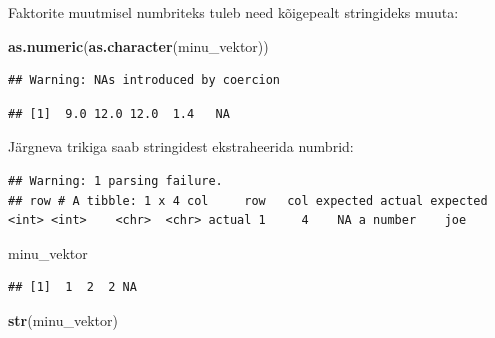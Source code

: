 \documentclass[]{book}
\newenvironment{Shaded}{\begin{snugshade}}{\end{snugshade}}
\newcommand{\KeywordTok}[1]{\textcolor[rgb]{0.13,0.29,0.53}{\textbf{#1}}}
\newcommand{\DecValTok}[1]{\textcolor[rgb]{0.00,0.00,0.81}{#1}}
\newcommand{\StringTok}[1]{\textcolor[rgb]{0.31,0.60,0.02}{#1}}
\newcommand{\NormalTok}[1]{#1}
\begin{document}
Faktorite muutmisel numbriteks tuleb need kõigepealt stringideks muuta:

\begin{Shaded}
\begin{Highlighting}[]
\KeywordTok{as.numeric}\NormalTok{(}\KeywordTok{as.character}\NormalTok{(minu_vektor))}
\end{Highlighting}
\end{Shaded}

\begin{verbatim}
## Warning: NAs introduced by coercion
\end{verbatim}

\begin{verbatim}
## [1]  9.0 12.0 12.0  1.4   NA
\end{verbatim}

Järgneva trikiga saab stringidest ekstraheerida numbrid:

\begin{Shaded}
\end{Shaded}

\begin{verbatim}
## Warning: 1 parsing failure.
## row # A tibble: 1 x 4 col     row   col expected actual expected   <int> <int>    <chr>  <chr> actual 1     4    NA a number    joe
\end{verbatim}

\begin{Shaded}
\begin{Highlighting}[]
\NormalTok{minu_vektor}
\end{Highlighting}
\end{Shaded}

\begin{verbatim}
## [1]  1  2  2 NA
\end{verbatim}

\begin{Shaded}
\begin{Highlighting}[]
\KeywordTok{str}\NormalTok{(minu_vektor)}
\end{Highlighting}
\end{Shaded}
\end{document}
